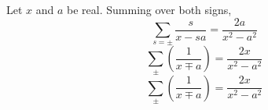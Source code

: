 \documentclass{article}
\begin{document}
Let $x$ and $a$ be real. Summing over both signs,
\begin{equation}
\sum_{s=\pm} \frac{s}{x - s a} = \frac{2a}{x^2-a^2}
\label{eq:s1}
\end{equation}
\begin{equation}
\sum\limits_{\pm} \left(\frac{1}{x \mp a}\right) = \frac{2x}{x^2-a^2}
\label{eq:s2}
\end{equation}
\begin{equation}
\sum_{\pm} \left(\frac{1}{x \mp a}\right) = \frac{2x}{x^2-a^2}
\label{eq:s3}
\end{equation}
\end{document}
